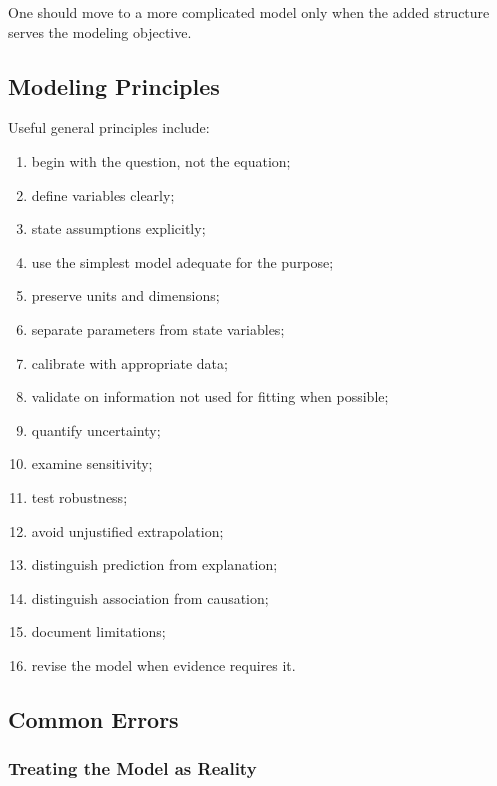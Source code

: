 One should move to a more complicated model only when the added structure
serves the modeling objective.

\subsection{Modeling Principles}
\label{subsec:modeling-principles}

Useful general principles include:

\begin{enumerate}
    \item begin with the question, not the equation;
    \item define variables clearly;
    \item state assumptions explicitly;
    \item use the simplest model adequate for the purpose;
    \item preserve units and dimensions;
    \item separate parameters from state variables;
    \item calibrate with appropriate data;
    \item validate on information not used for fitting when possible;
    \item quantify uncertainty;
    \item examine sensitivity;
    \item test robustness;
    \item avoid unjustified extrapolation;
    \item distinguish prediction from explanation;
    \item distinguish association from causation;
    \item document limitations;
    \item revise the model when evidence requires it.
\end{enumerate}

\subsection{Common Errors}
\label{subsec:mathematical-modeling-common-errors}

\subsubsection{Treating the Model as Reality}

